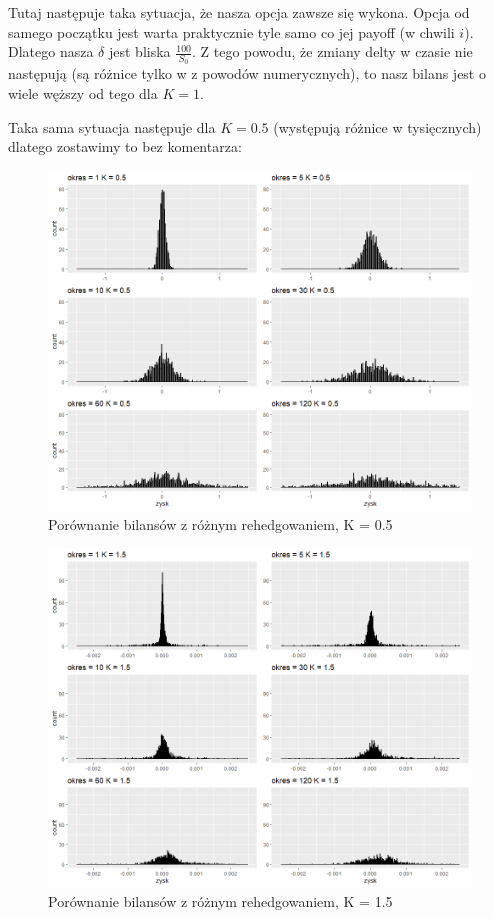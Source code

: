 \documentclass[12pt]{article}
\begin{document}
Tutaj następuje taka sytuacja, że nasza opcja zawsze się wykona. 
Opcja od samego początku jest warta praktycznie tyle samo co jej payoff (w chwili $i$). Dlatego nasza $\delta$ jest bliska $\frac{100}{S_0}$. Z tego powodu, że zmiany delty w czasie nie następują (są różnice tylko w z powodów numerycznych), to nasz bilans jest o wiele węższy od tego dla $K=1$. 

\newpage

Taka sama sytuacja następuje dla $K=0.5$ (występują różnice w tysięcznych) dlatego zostawimy to bez komentarza:

\begin{figure}[ht!]
\centering
\includegraphics[width=\linewidth]{bilanse_gold_0.5.png}
\caption{Porównanie bilansów z różnym rehedgowaniem, K = 0.5}
\end{figure}


\newpage

\begin{figure}[ht!]
\centering
\includegraphics[width=\linewidth]{bilanse_gold_1.5.png}
\caption{Porównanie bilansów z różnym rehedgowaniem, K = 1.5}
\end{figure}
\end{document}
